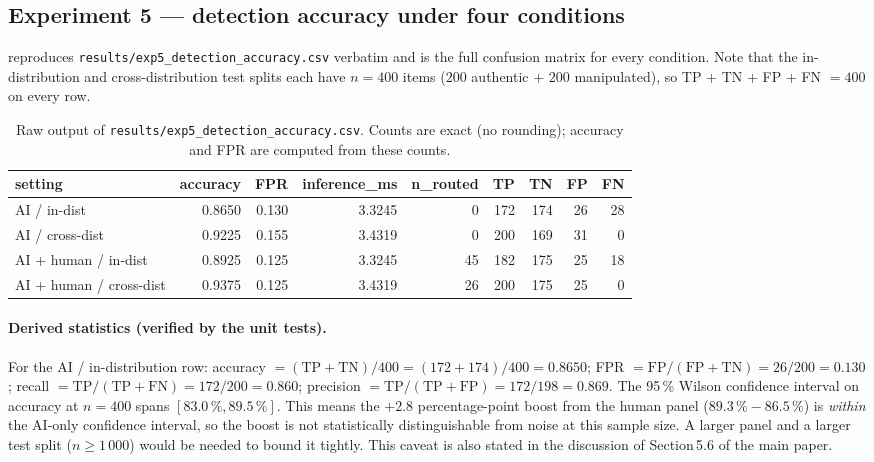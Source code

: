\documentclass[11pt,a4paper]{article}
\begin{document}
\subsection{Experiment 5 --- detection accuracy under four conditions}

 reproduces \texttt{results/exp5\_detection\_accuracy.csv}
verbatim and is the full confusion matrix for every condition. Note
that the in-distribution and cross-distribution test splits each
have $n\!=\!400$ items ($200$ authentic $+$ $200$ manipulated), so
TP + TN + FP + FN $=400$ on every row.

\begin{table}[!ht]\centering
\caption{Raw output of \texttt{results/exp5\_detection\_accuracy.csv}.
Counts are exact (no rounding); accuracy and FPR are computed from
these counts.}\label{tab:raw-exp5}
\small
\setlength{\tabcolsep}{3pt}
\begin{tabular}{l r r r r r r r r}
\toprule
setting & accuracy & FPR & inference\_ms & n\_routed & TP & TN & FP & FN \\
\midrule
AI / in-dist             & 0.8650 & 0.130 & 3.3245 &  0 & 172 & 174 & 26 & 28 \\
AI / cross-dist          & 0.9225 & 0.155 & 3.4319 &  0 & 200 & 169 & 31 &  0 \\
AI + human / in-dist     & 0.8925 & 0.125 & 3.3245 & 45 & 182 & 175 & 25 & 18 \\
AI + human / cross-dist  & 0.9375 & 0.125 & 3.4319 & 26 & 200 & 175 & 25 &  0 \\
\bottomrule
\end{tabular}
\end{table}

\paragraph{Derived statistics (verified by the unit tests).}
For the AI / in-distribution row:
accuracy $= (\mathrm{TP}+\mathrm{TN}) / 400 = (172+174)/400 = 0.8650$;
FPR $= \mathrm{FP}/(\mathrm{FP}+\mathrm{TN}) = 26/200 = 0.130$;
recall $= \mathrm{TP}/(\mathrm{TP}+\mathrm{FN}) = 172/200 = 0.860$;
precision $= \mathrm{TP}/(\mathrm{TP}+\mathrm{FP}) = 172/198 = 0.869$.
The 95\,\% Wilson confidence interval on accuracy at $n\!=\!400$
spans $[83.0\,\%, 89.5\,\%]$. This means the
$+2.8$ percentage-point boost from the human panel
($89.3\,\%\!-\!86.5\,\%$) is \emph{within} the AI-only confidence
interval, so the boost is not statistically distinguishable from
noise at this sample size. A larger panel and a larger test split
($n\!\geq\!1\,000$) would be needed to bound it tightly. This caveat
is also stated in the discussion of Section\,5.6 of the main paper.
\end{document}
